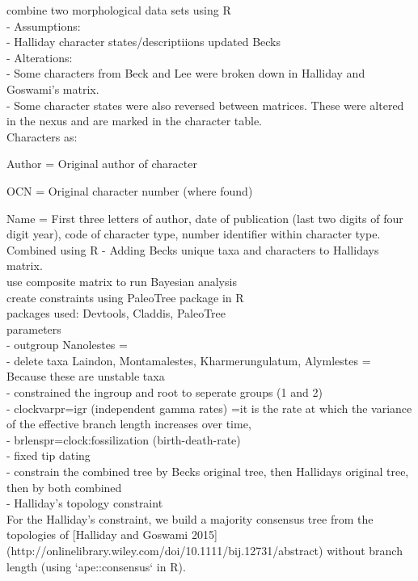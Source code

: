 \documentclass[a4paper,11pt]{article}
\begin{document}
combine two morphological data sets using R \\
 - Assumptions: \\ 
 - Halliday character states/descriptiions updated Becks\\ 

 - Alterations:\\
 - Some characters from Beck and Lee were broken down in Halliday and Goswami’s matrix. \\
 - Some character states were also reversed between matrices. These were altered in the nexus and are marked in the character table. \\
 
Characters as: 

Author = Original author of character

OCN = Original character number (where found)

Name = First three letters of author, date of publication (last two digits of four digit year), code of character type, number identifier within character type. \\ 
 
Combined using R - Adding Becks unique taxa and characters to Hallidays matrix. \\ 

use composite matrix to run Bayesian analysis\\
create constraints using PaleoTree package in R\\
packages used: Devtools, Claddis, PaleoTree \\

parameters\\
 - outgroup Nanolestes =\\
 - delete taxa Laindon, Montamalestes, Kharmerungulatum, Alymlestes = Because these are unstable taxa\\
 - constrained the ingroup and root to seperate groups (1 and 2)\\
 - clockvarpr=igr (independent gamma rates) =it is the rate at which the variance of the effective branch length increases over time,\\
 - brlenspr=clock:fossilization (birth-death-rate)\\
 - fixed tip dating\\
 - constrain the combined tree by Becks original tree, then Hallidays original tree, then by both combined\\

 - Halliday's topology constraint\\
For the Halliday's constraint, we build a majority consensus tree from the topologies of [Halliday and Goswami 2015]\\ (http://onlinelibrary.wiley.com/doi/10.1111/bij.12731/abstract) without branch length (using `ape::consensus` in R).
\end{document}
